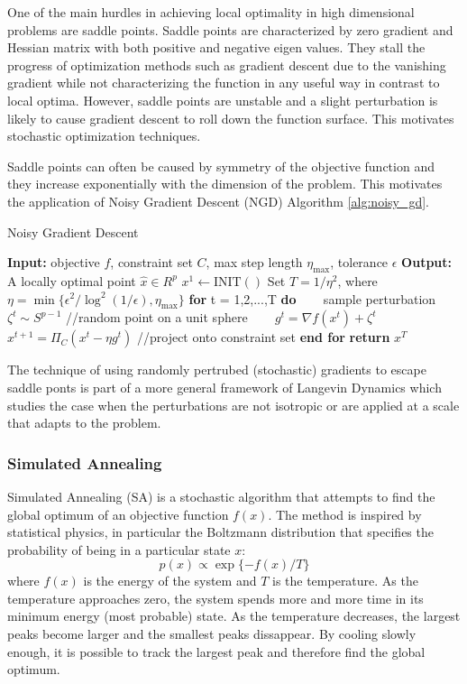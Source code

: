One of the main hurdles in achieving local optimality in high dimensional problems are saddle points. Saddle points are characterized by zero gradient and Hessian matrix with both positive and negative eigen values. They stall the progress of optimization methods such as gradient descent due to the vanishing gradient while not characterizing the function in any useful way in contrast to local optima. However, saddle points are unstable and a slight perturbation is likely to cause gradient descent to roll down the function surface. This motivates stochastic optimization techniques.

Saddle points can often be caused by symmetry of the objective function and they increase exponentially with the dimension of the problem. This motivates the application of Noisy Gradient Descent (NGD) Algorithm \ref{alg:noisy_gd}.

\begin{algorithm}
\caption{Noisy Gradient Descent}
\label{alg:noisy_gd}
\begin{algorithmic}[1]
\STATE \textbf{Input:} objective $f$, constraint set $C$, max step length $\eta_{\max}$, tolerance $\epsilon$
\STATE \textbf{Output:} A locally optimal point $\hat{x} \in R^{p}$ 
\STATE $x^{1} \leftarrow \mathrm{INIT}()$
\STATE Set $T = 1/\eta^{2}$, where $\eta = \min\{\epsilon^{2}/\log^{2}(1/\epsilon),\eta_{\max}\}$
\STATE \textbf{for} t = 1,2,...,T \textbf{do}
\STATE ~~~ sample perturbation $\zeta^{t} \sim S^{p-1}$ //random point on a unit sphere
\STATE ~~~ $g^{t} = \nabla f(x^{t}) + \zeta^{t}$
\STATE ~~~ $x^{t+1} = \Pi_{C}(x^{t} - \eta g^{t})$ //project onto constraint set
\STATE \textbf{end for}
\STATE \textbf{return} $x^{T}$
\end{algorithmic}
\end{algorithm}

The technique of using randomly pertrubed (stochastic) gradients to escape saddle ponts is part of a more general framework of Langevin Dynamics which studies the case when the perturbations are not isotropic or are applied at a scale that adapts to the problem. 

\subsubsection{Simulated Annealing}

Simulated Annealing (SA) is a stochastic algorithm that attempts to find the global optimum of an objective function $f(x)$. The method is inspired by statistical physics, in particular the Boltzmann distribution that specifies the probability of being in a particular state $x$:
\begin{equation}
    p(x) \propto \exp\{-f(x)/T\}
\end{equation}
where $f(x)$ is the energy of the system and $T$ is the temperature. As the temperature approaches zero, the system spends more and more time in its minimum energy (most probable) state. As the temperature decreases, the largest peaks become larger and the smallest peaks dissappear. By cooling slowly enough, it is possible to track the largest peak and therefore find the global optimum.\\

